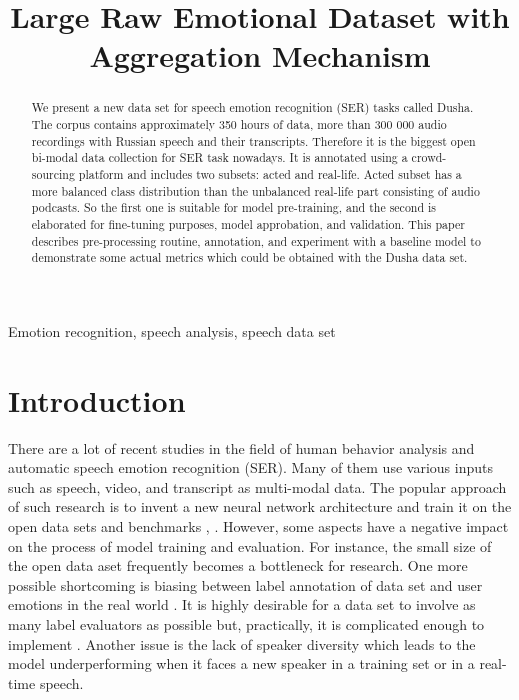 \documentclass{article}
\title{Large Raw Emotional Dataset with Aggregation Mechanism}
\begin{document}
\maketitle
\begin{abstract}
We present a new data set for speech emotion recognition (SER) tasks called Dusha. The corpus contains approximately 350 hours of data, more than 300 000 audio recordings with Russian speech and their transcripts. Therefore it is the biggest open bi-modal data collection for SER task nowadays. It is annotated using a crowd-sourcing platform and includes two subsets: acted and real-life. Acted subset has a more balanced class distribution than the unbalanced real-life part consisting of audio podcasts. So the first one is suitable for model pre-training, and the second is elaborated for fine-tuning purposes, model approbation, and validation. This paper describes pre-processing routine, annotation, and experiment with a baseline model to demonstrate some actual metrics which could be obtained with the Dusha data set.

\end{abstract}
\begin{keywords}
Emotion recognition, speech analysis, speech data set
\end{keywords}
\section{Introduction}
\label{sec:intro}



There are a lot of recent studies in the field of human behavior analysis and automatic speech emotion recognition (SER). Many of them use various inputs such as speech, video, and transcript as multi-modal data. The popular approach of such research is to invent a new neural network architecture and train it on the open data sets and benchmarks \cite{ser_deepml1}, \cite{ser_deepml2}. However, some aspects have a negative impact on the process of model training and evaluation. For instance, the small size of the open data aset frequently becomes a bottleneck for research. One more possible shortcoming is biasing between label annotation of data set and user emotions in the real world \cite{ser_trends}. It is highly desirable for a data set to involve as many label evaluators as possible but, practically, it is complicated enough to implement \cite{ser_annotation}. Another issue is the lack of speaker diversity which leads to the model underperforming when it faces a new speaker in a training set or in a real-time speech. 
\end{document}
